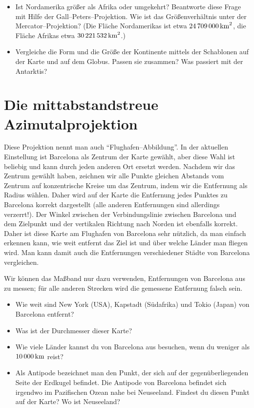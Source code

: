 \documentclass[a4paper,12pt]{article}
\begin{document}
\begin{itemize}
 \item Ist Nordamerika größer als Afrika oder umgekehrt? Beantworte diese Frage mit 
       Hilfe der Gall--Peters--Projektion. Wie ist das Größenverhältnis unter der 
       Mercator--Projektion?
       (Die Fläche Nordamerikas ist etwa $24\,709\,000\,{\rm km}^2$, die Fläche 
       Afrikas etwa $30\,221\,532\,{\rm km}^2$.)

 \item Vergleiche die Form und die Größe der Kontinente mittels der Schablonen 
       auf der Karte und auf dem Globus. Passen sie zusammen? Was passiert mit der 
       Antarktis?
\end{itemize}



\newpage
\section{Die mittabstandstreue Azimutalprojektion}
\label{sec-azimuthal}

Diese Projektion nennt man auch "`Flughafen--Abbildung"'. In der aktuellen Einstellung 
ist Barcelona als Zentrum der Karte gewählt, aber diese Wahl ist beliebig und kann 
durch jeden anderen Ort ersetzt werden. Nachdem wir das Zentrum gewählt haben, zeichnen
wir alle Punkte gleichen Abstands vom Zentrum auf konzentrische Kreise um das Zentrum,
indem wir die Entfernung als Radius wählen. Daher wird auf der Karte die Entfernung 
jedes Punktes zu Barcelona korrekt dargestellt (alle anderen Entfernungen sind allerdings 
verzerrt!). Der Winkel zwischen der Verbindungslinie zwischen Barcelona und dem Zielpunkt 
und der vertikalen Richtung nach Norden ist ebenfalls korrekt. Daher ist diese Karte 
am Flughafen von Barcelona sehr nützlich, da man einfach erkennen kann, wie weit 
entfernt das Ziel ist und über welche Länder man fliegen wird. Man kann damit auch 
die Entfernungen verschiedener Städte von Barcelona vergleichen.

Wir können das Maßband nur dazu verwenden, Entfernungen von Barcelona aus zu messen;
für alle anderen Strecken wird die gemessene Entfernung falsch sein.

\begin{itemize}
 \item Wie weit sind New York (USA), Kapstadt (Südafrika) und Tokio (Japan) von 
       Barcelona entfernt?
 \item Was ist der Durchmesser dieser Karte?
 \item Wie viele Länder kannst du von Barcelona aus besuchen, wenn du weniger als 
       $10\,000\,{\rm km}$ reist?
 \item Als Antipode bezeichnet man den Punkt, der sich auf der gegenüberliegenden
       Seite der Erdkugel befindet. Die Antipode von Barcelona befindet sich irgendwo 
       im Pazifischen Ozean nahe bei Neuseeland. Findest du diesen Punkt auf der Karte?
       Wo ist Neuseeland?
\end{itemize}
\end{document}
